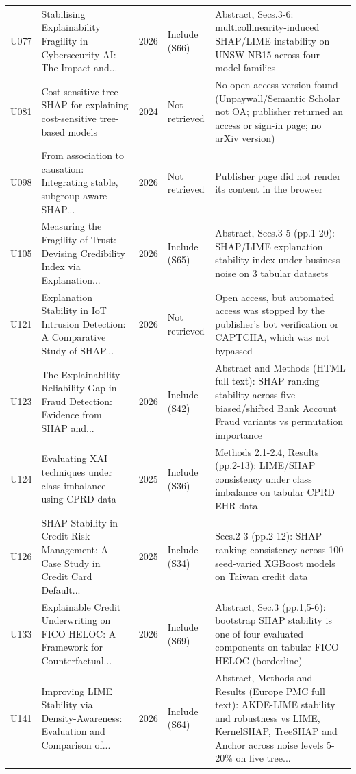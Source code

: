 \begin{longtable}{@{}P{1.0cm}P{6.3cm}P{0.7cm}P{1.6cm}P{6.1cm}@{}}
U077 & Stabilising Explainability Fragility in Cybersecurity AI: The Impact and... & 2026 & Include (S66) & Abstract, Secs.3-6: multicollinearity-induced SHAP/\allowbreak{}LIME instability on UNSW-NB15 across four model families \\
U081 & Cost-sensitive tree SHAP for explaining cost-sensitive tree-based models & 2024 & Not retrieved & No open-access version found (Unpaywall/\allowbreak{}Semantic Scholar not OA; publisher returned an access or sign-in page; no arXiv version) \\
U098 & From association to causation: Integrating stable, subgroup-aware SHAP... & 2026 & Not retrieved & Publisher page did not render its content in the browser \\
U105 & Measuring the Fragility of Trust: Devising Credibility Index via Explanation... & 2026 & Include (S65) & Abstract, Secs.3-5 (pp.1-20): SHAP/\allowbreak{}LIME explanation stability index under business noise on 3 tabular datasets \\
U121 & Explanation Stability in IoT Intrusion Detection: A Comparative Study of SHAP... & 2026 & Not retrieved & Open access, but automated access was stopped by the publisher's bot verification or CAPTCHA, which was not bypassed \\
U123 & The Explainability--Reliability Gap in Fraud Detection: Evidence from SHAP and... & 2026 & Include (S42) & Abstract and Methods (HTML full text): SHAP ranking stability across five biased/\allowbreak{}shifted Bank Account Fraud variants vs permutation importance \\
U124 & Evaluating XAI techniques under class imbalance using CPRD data & 2025 & Include (S36) & Methods 2.1-2.4, Results (pp.2-13): LIME/\allowbreak{}SHAP consistency under class imbalance on tabular CPRD EHR data \\
U126 & SHAP Stability in Credit Risk Management: A Case Study in Credit Card Default... & 2025 & Include (S34) & Secs.2-3 (pp.2-12): SHAP ranking consistency across 100 seed-varied XGBoost models on Taiwan credit data \\
U133 & Explainable Credit Underwriting on FICO HELOC: A Framework for Counterfactual... & 2026 & Include (S69) & Abstract, Sec.3 (pp.1,5-6): bootstrap SHAP stability is one of four evaluated components on tabular FICO HELOC (borderline) \\
U141 & Improving LIME Stability via Density-Awareness: Evaluation and Comparison of... & 2026 & Include (S64) & Abstract, Methods and Results (Europe PMC full text): AKDE-LIME stability and robustness vs LIME, KernelSHAP, TreeSHAP and Anchor across noise levels 5-20\% on five tree... \\

\end{longtable}
